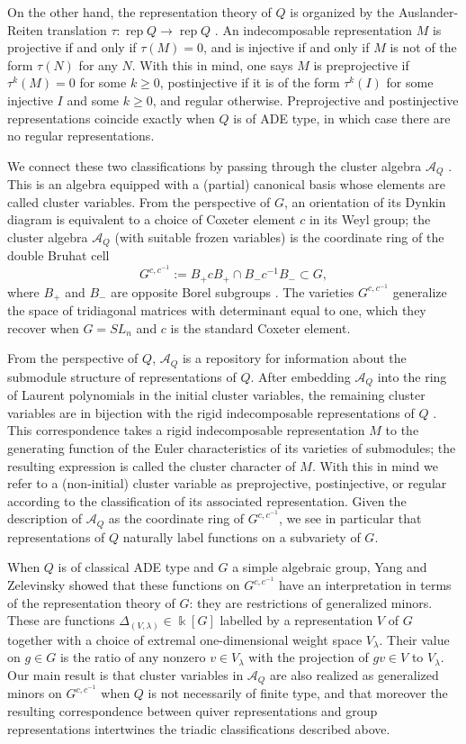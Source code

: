 \documentclass[12pt]{amsart}
\newcommand{\cA}{\mathcal{A}}
\newcommand{\kk}{\Bbbk}
\newcommand{\rep}{\operatorname{rep}}
\newcommand{\Qrep}{M}
\theoremstyle{remark}
\numberwithin{equation}{section}
\numberwithin{figure}{section}
\begin{document}
On the other hand, the representation theory of $Q$ is organized by the Auslander-Reiten translation $\tau: \rep Q \to \rep Q$ \cite{ASS06}.
An indecomposable representation $M$ is projective if and only if $\tau(M) = 0$, and is injective if and only if $M$ is not of the form $\tau(N)$ for any $N$.
With this in mind, one says $M$ is preprojective if $\tau^k(M) = 0$ for some $k\ge 0$, postinjective if it is of the form $\tau^k(I)$ for some injective $I$ and some $k\ge0$, and regular otherwise.
Preprojective and postinjective representations coincide exactly when $Q$ is of ADE type, in which case there are no regular representations.

We connect these two classifications by passing through the cluster algebra $\cA_Q$ \cite{FZ02}.
This is an algebra equipped with a (partial) canonical basis whose elements are called cluster variables.
From the perspective of $G$, an orientation of its Dynkin diagram is equivalent to a choice of Coxeter element $c$ in its Weyl group; the cluster algebra $\cA_Q$ (with suitable frozen variables) is the coordinate ring of the double Bruhat cell 
\[
  G^{c,c^{-1}} := B_+ c B_+ \cap B_- c^{-1} B_- \subset G,
\]
where $B_+$ and $B_-$ are opposite Borel subgroups \cite{BFZ05,Wil13}.
The varieties $G^{c,c^{-1}}$ generalize the space of tridiagonal matrices with determinant equal to one, which they recover when $G=SL_n$ and $c$ is the standard Coxeter element.

From the perspective of $Q$, $\cA_Q$ is a repository for information about the submodule structure of representations of $Q$.
After embedding $\cA_Q$ into the ring of Laurent polynomials in the initial cluster variables, the remaining cluster variables are in bijection with the rigid indecomposable representations of $Q$ \cite{CC,CK}.
This correspondence takes a rigid indecomposable representation $\Qrep$ to the generating function of the Euler characteristics of its varieties of submodules; the resulting expression is called the cluster character of $\Qrep$.
With this in mind we refer to a (non-initial) cluster variable as preprojective, postinjective, or regular according to the classification of its associated representation.
Given the description of $\cA_Q$ as the coordinate ring of $G^{c,c^{-1}}$, we see in particular that representations of $Q$ naturally label functions on a subvariety of $G$.

When $Q$ is of classical ADE type and $G$ a simple algebraic group, Yang and Zelevinsky \cite{YZ08} showed that these functions on $G^{c,c^{-1}}$ have an interpretation in terms of the representation theory of $G$: they are restrictions of generalized minors. These are functions $\Delta_{(V,\lambda)} \in \kk[G]$ labelled by a representation $V$ of $G$ together with a choice of extremal one-dimensional weight space $V_\lambda$.
Their value on $g \in G$ is the ratio of any nonzero $v \in V_\lambda$ with the projection of $gv \in V$ to $V_\lambda$.
Our main result is that cluster variables in $\cA_Q$ are also realized as generalized minors on $G^{c,c^{-1}}$ when $Q$ is not necessarily of finite type, and that moreover the resulting correspondence between quiver representations and group representations intertwines the triadic classifications described above.
\end{document}
